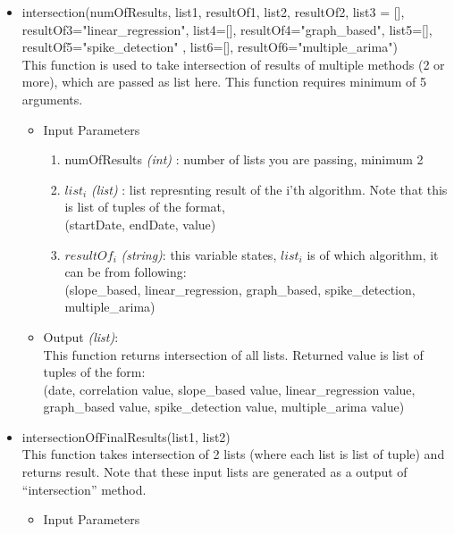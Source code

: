 \begin{itemize}
   
   
   \item intersection(numOfResults, list1, resultOf1, list2, resultOf2, list3 = 
[], resultOf3="linear\_regression", list4=[], resultOf4="graph\_based", 
list5=[], resultOf5="spike\_detection" , list6=[], resultOf6="multiple\_arima") 
\\
  This function is used to take intersection of results of multiple methods (2 
or more), which are passed as list here. This function requires minimum of 5 
arguments. 
   
   \begin{itemize}
 \item Input Parameters
 
 \begin{enumerate}
  \item numOfResults \textit{(int)} : number of lists you are passing, minimum 2
  \item $list_i$ \textit{(list)} : list represnting result of the i'th 
algorithm. Note that this is list of tuples of the format, \\
  (startDate, endDate, value)
  \item $resultOf_i$ \textit{(string)}: this variable states, $list_i$ is of 
which algorithm, it can be from following: \\
            (slope\_based, linear\_regression, graph\_based, spike\_detection, 
multiple\_arima)

 \end{enumerate}

 \item Output \textit{(list)}: \\
 This function returns intersection of all lists. Returned value is list of 
tuples of the form: \\
 (date, correlation value, slope\_based value, linear\_regression value, 
graph\_based value, spike\_detection value, multiple\_arima value)

 \end{itemize}
   
   
   
   
   \item intersectionOfFinalResults(list1, list2) \\
  
  This function takes intersection of 2 lists (where each list is list of 
tuple) and returns result. Note that these input lists are generated as a output 
of ``intersection'' method.
 \begin{itemize}
 \item Input Parameters
 

\end{itemize}
\end{itemize}
